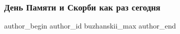  
 
 
 
 
 
\subsubsection{День Памяти и Скорби как раз сегодня}
\label{sec:22_06_2020.fb.buzhanskii_max.1.den_pamjati_i_skorbi}
\ifcmt
 author_begin
   author_id buzhanskii_max
 author_end
\fi

